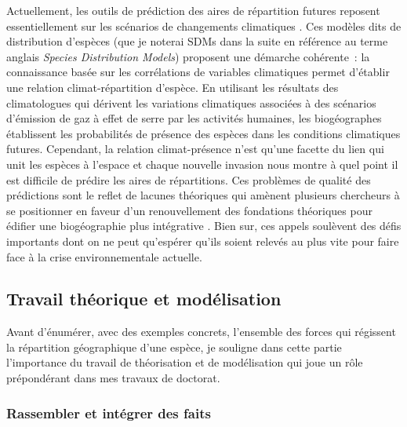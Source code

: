 Actuellement, les outils de prédiction des aires de répartition futures
reposent essentiellement sur les scénarios de changements climatiques
\citep{Peterson2011}. Ces modèles dits de distribution d'espèces (que je
noterai SDMs dans la suite en référence au terme anglais \emph{Species
Distribution Models}) proposent une démarche cohérente~: la connaissance
basée sur les corrélations de variables climatiques permet d'établir une
relation climat-répartition d'espèce. En utilisant les résultats des
climatologues qui dérivent les variations climatiques associées à des
scénarios d'émission de gaz à effet de serre par les activités humaines,
les biogéographes établissent les probabilités de présence des espèces
dans les conditions climatiques futures. Cependant, la relation
climat-présence n'est qu'une facette du lien qui unit les espèces à
l'espace et chaque nouvelle invasion nous montre à quel point il est
difficile de prédire les aires de répartitions. Ces problèmes de qualité
des prédictions sont le reflet de lacunes théoriques qui amènent
plusieurs chercheurs à se positionner en faveur d'un renouvellement des
fondations théoriques pour édifier une biogéographie plus intégrative
\citep{Lomolino2000, Beck2012, Thuiller2013}. Bien sur, ces appels
soulèvent des défis importants dont on ne peut qu'espérer qu'ils soient
relevés au plus vite pour faire face à la crise environnementale
actuelle.

\subsection*{Travail théorique et
modélisation}\label{travail-thuxe9orique-et-moduxe9lisation}

Avant d'énumérer, avec des exemples concrets, l'ensemble des forces qui
régissent la répartition géographique d'une espèce, je souligne dans
cette partie l'importance du travail de théorisation et de modélisation
qui joue un rôle prépondérant dans mes travaux de doctorat.

\subsubsection*{Rassembler et intégrer des
faits}\label{rassembler-et-intuxe9grer-des-faits}

